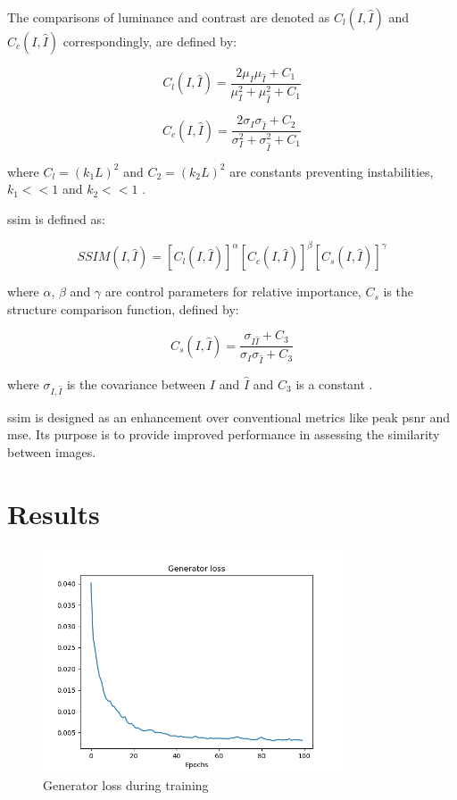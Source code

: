 \documentclass[conference]{IEEEtran}
\begin{document}
The comparisons of luminance and contrast are denoted as $C_l(I, \hat{I})$ and $C_c(I, \hat{I})$ correspondingly, are defined by:

\begin{equation}  \label{eq:comp_luminosity}
    C_l(I, \hat{I}) = \frac{2 \mu_I \mu_{\hat{I}} + C_1 }{\mu_I^2 + \mu_{\hat{I}}^2 + C_1}
\end{equation}

\begin{equation}  \label{eq:comp_contrast}
    C_c(I, \hat{I}) = \frac{2 \sigma_I \sigma_{\hat{I}} + C_2 }{\sigma_I^2 + \sigma_{\hat{I}}^2 + C_1}
\end{equation}

where $C_l = (k_1 L)^2$ and $C_2 = (k_2 L)^2$ are constants preventing instabilities, $k_1 << 1$ and $k_2 << 1$ \cite{deep_learning_image_sr_2020}.

\Acrfull{ssim} is defined as:

\begin{equation}  \label{eq:ssim}
    SSIM(I,\hat{I}) = [C_l(I, \hat{I})]^{\alpha} [C_c(I, \hat{I})]^{\beta} [C_s(I, \hat{I})]^{\gamma}
\end{equation}

where $\alpha$, $\beta$ and $\gamma$ are control parameters for relative importance, $C_s$ is the structure comparison function, defined by:

\begin{equation}  \label{eq:structure_comp_f}
    C_s(I, \hat{I}) = \frac{\sigma_{I\hat{I}}+C_3}{\sigma_I \sigma_{\hat{I}}+C_3}
\end{equation}

where $\sigma_{I, \hat{I}}$ is the covariance between $I$ and $\hat{I}$ and $C_3$ is a constant \cite{deep_learning_image_sr_2020}.

\Acrfull{ssim} is designed as an enhancement over conventional metrics like peak \acrshort{psnr} and \acrshort{mse}. Its purpose is to provide improved performance in assessing the similarity between images.

\section{Results}

\begin{figure}[t]
	\centering
    \centerline{\includegraphics[width=8.9cm]{results/g_loss}}
	\caption{Generator loss during training}
	\label{fig:generator_training_loss}
\end{figure}
\end{document}
